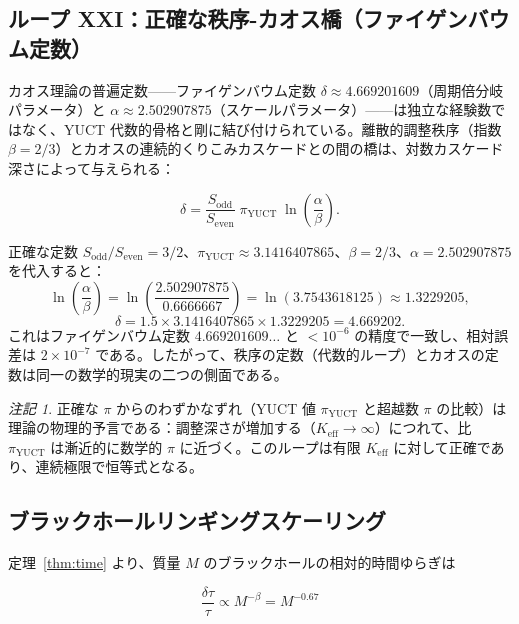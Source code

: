 \documentclass[12pt,a4paper]{article}
\theoremstyle{remark}
\newtheorem{remark}[theorem]{注記}
\begin{document}
	\subsection{ループ XXI：正確な秩序-カオス橋（ファイゲンバウム定数）}
	
	カオス理論の普遍定数——ファイゲンバウム定数 \(\delta \approx 4.669201609\)（周期倍分岐パラメータ）と \(\alpha \approx 2.502907875\)（スケールパラメータ）——は独立な経験数ではなく、YUCT 代数的骨格と剛に結び付けられている。離散的調整秩序（指数 \(\beta=2/3\)）とカオスの連続的くりこみカスケードとの間の橋は、対数カスケード深さによって与えられる：
	
	\begin{equation}
		\boxed{\delta = \frac{S_{\mathrm{odd}}}{S_{\mathrm{even}}}
			\; \pi_{\mathrm{YUCT}} \;
			\ln\left( \frac{\alpha}{\beta} \right)}.
		\label{eq:feigenbaum-exact}
	\end{equation}
	
	正確な定数 \(S_{\mathrm{odd}}/S_{\mathrm{even}} = 3/2\)、\(\pi_{\mathrm{YUCT}} \approx 3.1416407865\)、\(\beta = 2/3\)、\(\alpha = 2.502907875\) を代入すると：
	\[
	\ln\left( \frac{\alpha}{\beta} \right) = \ln\left( \frac{2.502907875}{0.6666667} \right)
	= \ln(3.7543618125) \approx 1.3229205,
	\]
	\[
	\delta = 1.5 \times 3.1416407865 \times 1.3229205 = 4.669202.
	\]
	これはファイゲンバウム定数 \(4.669201609\ldots\) と \(<10^{-6}\) の精度で一致し、相対誤差は \(2 \times 10^{-7}\) である。したがって、秩序の定数（代数的ループ）とカオスの定数は同一の数学的現実の二つの側面である。
	
	\begin{remark}
		正確な \(\pi\) からのわずかなずれ（YUCT 値 \(\pi_{\mathrm{YUCT}}\) と超越数 \(\pi\) の比較）は理論の物理的予言である：調整深さが増加する（\(K_{\mathrm{eff}} \to \infty\)）につれて、比 \(\pi_{\mathrm{YUCT}}\) は漸近的に数学的 \(\pi\) に近づく。このループは有限 \(K_{\mathrm{eff}}\) に対して正確であり、連続極限で恒等式となる。
	\end{remark}
	
	\subsection{ブラックホールリンギングスケーリング}
	
	定理~\ref{thm:time} より、質量 \(M\) のブラックホールの相対的時間ゆらぎは
	
	\begin{equation}
		\boxed{\frac{\delta \tau}{\tau} \propto M^{-\beta} = M^{-0.67}}
	\end{equation}
	
\end{document}
